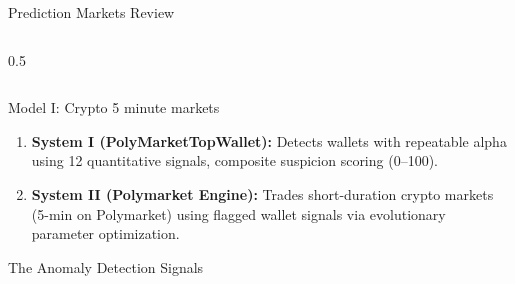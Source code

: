 \documentclass[final]{beamer}
\newlength{\colwidth}
\begin{document}
\begin{frame}[t]
\begin{columns}[t]
\begin{column}{\colwidth}
\begin{block}{Prediction Markets Review}
\begin{columns}[t]
\begin{column}{0.5\linewidth}
    \end{column}
    \end{columns}
  \end{block}



    \begin{block}{Model I: Crypto 5 minute markets}
      \begin{enumerate}
        \item \textbf{System I (PolyMarketTopWallet):} Detects wallets with repeatable alpha using 12 quantitative signals, composite suspicion scoring (0--100).
        \item \textbf{System II (Polymarket Engine):} Trades short-duration crypto markets (5-min on Polymarket) using flagged wallet signals via evolutionary parameter optimization.
      \end{enumerate}

    \end{block}


    \begin{block}{The Anomaly Detection Signals}
      

\end{block}
\end{column}
\end{columns}
\end{frame}
\end{document}
